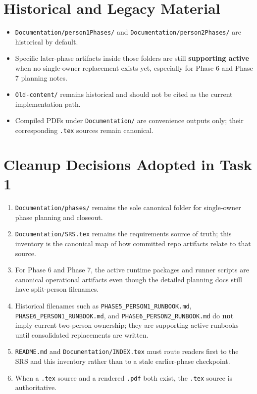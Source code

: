 \documentclass{article}
\begin{document}
\section*{Historical and Legacy Material}
\begin{itemize}
\item \texttt{Documentation/person1Phases/} and \texttt{Documentation/person2Phases/} are historical by default.
\item Specific later-phase artifacts inside those folders are still \textbf{supporting active} when no single-owner replacement exists yet, especially for Phase 6 and Phase 7 planning notes.
\item \texttt{Old-content/} remains historical and should not be cited as the current implementation path.
\item Compiled PDFs under \texttt{Documentation/} are convenience outputs only; their corresponding \texttt{.tex} sources remain canonical.
\end{itemize}

\section*{Cleanup Decisions Adopted in Task 1}
\begin{enumerate}
\item \texttt{Documentation/phases/} remains the sole canonical folder for single-owner phase planning and closeout.
\item \texttt{Documentation/SRS.tex} remains the requirements source of truth; this inventory is the canonical map of how committed repo artifacts relate to that source.
\item For Phase 6 and Phase 7, the active runtime packages and runner scripts are canonical operational artifacts even though the detailed planning docs still have split-person filenames.
\item Historical filenames such as \texttt{PHASE5\_PERSON1\_RUNBOOK.md}, \texttt{PHASE6\_PERSON1\_RUNBOOK.md}, and \texttt{PHASE6\_PERSON2\_RUNBOOK.md} do \textbf{not} imply current two-person ownership; they are supporting active runbooks until consolidated replacements are written.
\item \texttt{README.md} and \texttt{Documentation/INDEX.tex} must route readers first to the SRS and this inventory rather than to a stale earlier-phase checkpoint.
\item When a \texttt{.tex} source and a rendered \texttt{.pdf} both exist, the \texttt{.tex} source is authoritative.
\end{enumerate}
\end{document}

